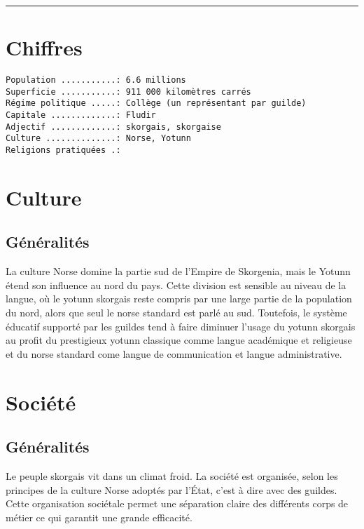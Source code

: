 \documentclass[french, a4paper, 12pt]{article}
\begin{document}
 \maketitle \vspace{3pt} \hrule \vspace{3pt}

\section{Chiffres}

\begin{verbatim}
Population ...........: 6.6 millions
Superficie ...........: 911 000 kilomètres carrés
Régime politique .....: Collège (un représentant par guilde)
Capitale .............: Fludir
Adjectif .............: skorgais, skorgaise
Culture ..............: Norse, Yotunn
Religions pratiquées .:
\end{verbatim}

\section{Culture}

\subsection{Généralités}

La culture Norse domine la partie sud de l'Empire de Skorgenia, mais le Yotunn étend son influence au nord du pays. Cette division est sensible au niveau de la langue, où le yotunn skorgais reste compris par une large partie de la population du nord, alors que seul le norse standard est parlé au sud. Toutefois, le système éducatif supporté par les guildes tend à faire diminuer l'usage du yotunn skorgais au profit du prestigieux yotunn classique comme langue académique et religieuse et du norse standard come langue de communication et langue administrative.

\section{Société}

\subsection{Généralités}

Le peuple skorgais vit dans un climat froid. La société est organisée, selon les principes de la culture Norse adoptés par l'État, c'est à dire avec des guildes. Cette organisation sociétale permet une séparation claire des différents corps de métier ce qui garantit une grande efficacité.
\end{document}
